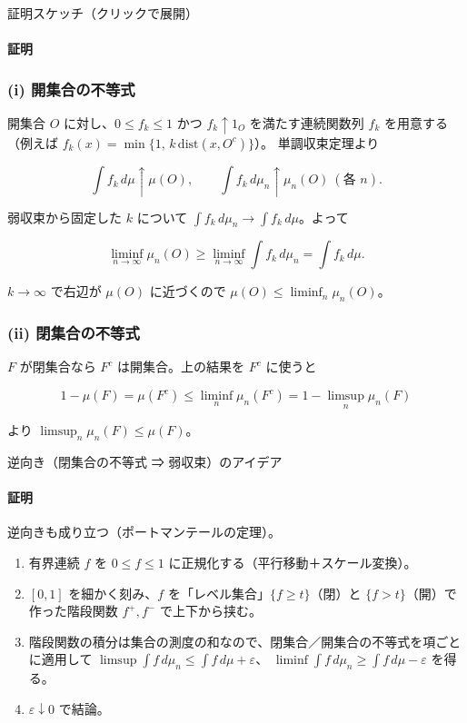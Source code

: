 \documentclass[uplatex,dvipdfmx,11pt,a4paper,openany]{bxjsbook}
\begin{document}
\begin{detailblock}{証明スケッチ（クリックで展開）}
\paragraph{証明}
\subsubsection{(i) 開集合の不等式}
開集合 $O$ に対し、$0\le f_k\le 1$ かつ $f_k\uparrow 1_O$ を満たす連続関数列 $f_k$ を用意する
            （例えば $f_k(x)=\min\{1,\,k\,\mathrm{dist}(x,O^c)\}$）。
            単調収束定理より

\[\int f_k\,d\mu \uparrow \mu(O),\qquad
            \int f_k\,d\mu_n \uparrow \mu_n(O)\ (\text{各 }n).\]

弱収束から固定した $k$ について $\int f_k\,d\mu_n\to\int f_k\,d\mu$。よって

\[\liminf_{n\to\infty}\mu_n(O)\ge \liminf_{n\to\infty}\int f_k\,d\mu_n=\int f_k\,d\mu.\]

$k\to\infty$ で右辺が $\mu(O)$ に近づくので $\mu(O)\le\liminf_n \mu_n(O)$。

\subsubsection{(ii) 閉集合の不等式}
$F$ が閉集合なら $F^c$ は開集合。上の結果を $F^c$ に使うと

\[1-\mu(F)=\mu(F^c)\le \liminf_n \mu_n(F^c)=1-\limsup_n \mu_n(F)\]

より $\limsup_n \mu_n(F)\le\mu(F)$。


\end{detailblock}

\begin{detailblock}{逆向き（閉集合の不等式 ⇒ 弱収束）のアイデア}
\paragraph{証明}
逆向きも成り立つ（ポートマンテールの定理）。

\begin{enumerate}
\item 有界連続 $f$ を $0\le f\le 1$ に正規化する（平行移動＋スケール変換）。
\item $[0,1]$ を細かく刻み、$f$ を「レベル集合」$\{f\ge t\}$（閉）と $\{f>t\}$（開）で作った階段関数 $f^+,f^-$ で上下から挟む。
\item 階段関数の積分は集合の測度の和なので、閉集合／開集合の不等式を項ごとに適用して
              $\limsup\int f\,d\mu_n\le\int f\,d\mu+\varepsilon$、
              $\liminf\int f\,d\mu_n\ge\int f\,d\mu-\varepsilon$ を得る。
\item $\varepsilon\downarrow 0$ で結論。
\end{enumerate}


\end{detailblock}
\end{document}
